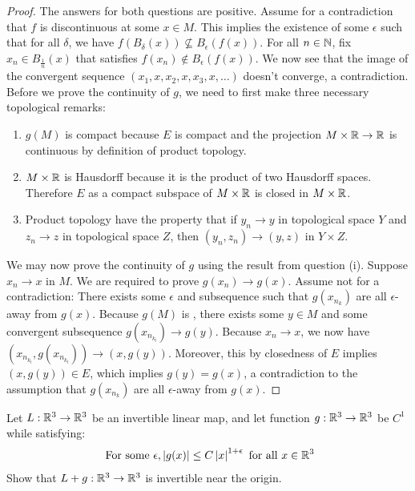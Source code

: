 \documentclass{report}
\begin{document}
\begin{proof}
The answers for both questions are positive. Assume for a contradiction that $f$ is discontinuous at some $x \in M$. This implies the existence of some $\epsilon $ such that for all $\delta$, we have $f(B_\delta(x))\not \subseteq B_\epsilon (f(x))$. For all $n\in\mathbb{N}$, fix $x_n \in B_{\frac{1}{n}}(x)$ that satisfies $f(x_n)\not\in B_\epsilon (f(x))$. We now see that the image of the convergent sequence $(x_1,x,x_2,x,x_3,x,\dots) $  doesn't converge, a contradiction.\\

Before we prove the continuity of $g$, we need to first make three necessary topological remarks: 
 \begin{enumerate}[label=(\alph*)]
  \item $g(M)$ is compact because $E$ is compact and the projection $M\times \mathbb{R}\rightarrow \mathbb{R}$ is continuous by definition of product topology.   
  \item $M\times \mathbb{R}$ is Hausdorff because it is the product of two Hausdorff spaces. Therefore $E$ as a compact subspace of $M\times \mathbb{R} $ is closed in $M\times \mathbb{R}$.  
  \item Product topology have the property that if $y_n \rightarrow y$ in topological space $Y$ and  $z_n \rightarrow z$ in topological space $Z$, then $(y_n,z_n)\rightarrow (y,z)$ in $Y\times Z$. 
\end{enumerate}
We may now prove the continuity of $g$ using the result from question (i). Suppose $x_n\rightarrow x$ in $M$. We are required to prove $g(x_n)\rightarrow g(x)$. Assume not for a contradiction: There exists some $\epsilon $ and subsequence such that $g(x_{n_k})$ are all $\epsilon$-away from $g(x)$.  Because $g(M)$ is , there exists some $y \in M$ and some convergent subsequence $g(x_{n_{k_l}})\rightarrow g(y)$. Because $x_n\rightarrow x$, we now have $(x_{n_{k_l}},g(x_{n_{k_l}}))\rightarrow (x,g(y))$. Moreover, this by closedness of $E$ implies  $(x,g(y))\in E$, which implies $g(y)=g(x)$, a contradiction to the assumption that $g(x_{n_k})$ are all $\epsilon $-away from $g(x)$.  




\end{proof}
\begin{question}{}{}
Let $L:\mathbb{R}^3 \rightarrow \mathbb{R}^3$ be an invertible linear map, and let function $g:\mathbb{R}^3 \rightarrow \mathbb{R}^3$ be $C^1$ while satisfying: 
 \begin{align*}
\text{ For some }\epsilon ,\left|g(x)\right|\leq C \left|x\right|^{1+\epsilon }\text{ for all }x\in\mathbb{R}^3
\end{align*}
Show that $L+g:\mathbb{R}^3 \rightarrow \mathbb{R}^3$ is invertible near the origin.  
\end{question}
\end{document}
